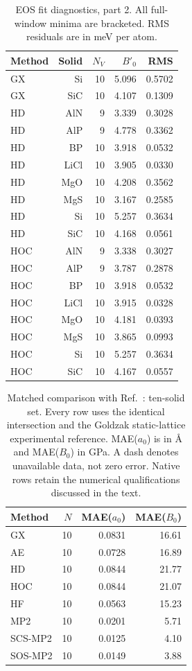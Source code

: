 \begin{table}[t]
\centering
\small
\caption{EOS fit diagnostics, part 2. All full-window minima are bracketed. RMS residuals are in meV per atom.}
\label{tab:eos-fit-2}
\begin{tabular}{lrrrr}
\toprule
Method & Solid & $N_V$ & $B'_0$ & RMS \\
\midrule
GX & Si & 10 & 5.096 & 0.5702 \\
GX & SiC & 10 & 4.107 & 0.1309 \\
HD & AlN & 9 & 3.339 & 0.3028 \\
HD & AlP & 9 & 4.778 & 0.3362 \\
HD & BP & 10 & 3.918 & 0.0532 \\
HD & LiCl & 10 & 3.905 & 0.0330 \\
HD & MgO & 10 & 4.208 & 0.3562 \\
HD & MgS & 10 & 3.167 & 0.2585 \\
HD & Si & 10 & 5.257 & 0.3634 \\
HD & SiC & 10 & 4.168 & 0.0561 \\
HOC & AlN & 9 & 3.338 & 0.3027 \\
HOC & AlP & 9 & 3.787 & 0.2878 \\
HOC & BP & 10 & 3.918 & 0.0532 \\
HOC & LiCl & 10 & 3.915 & 0.0328 \\
HOC & MgO & 10 & 4.181 & 0.0393 \\
HOC & MgS & 10 & 3.865 & 0.0993 \\
HOC & Si & 10 & 5.257 & 0.3634 \\
HOC & SiC & 10 & 4.167 & 0.0557 \\
\bottomrule
\end{tabular}
\end{table}

\begin{table}[t]
\centering
\small
\caption{Matched comparison with Ref.~: ten-solid set. Every row uses the identical intersection and the Goldzak static-lattice experimental reference. MAE($a_0$) is in \AA{} and MAE($B_0$) in GPa. A dash denotes unavailable data, not zero error. Native rows retain the numerical qualifications discussed in the text.}
\label{tab:literature-Goldzak2022}
\begin{tabular}{lrrr}
\toprule
Method & $N$ & MAE($a_0$) & MAE($B_0$) \\
\midrule
GX & 10 & 0.0831 & 16.61 \\
AE & 10 & 0.0728 & 16.89 \\
HD & 10 & 0.0844 & 21.77 \\
HOC & 10 & 0.0844 & 21.07 \\
HF & 10 & 0.0563 & 15.23 \\
MP2 & 10 & 0.0201 & 5.71 \\
SCS-MP2 & 10 & 0.0125 & 4.10 \\
SOS-MP2 & 10 & 0.0149 & 3.88 \\
\bottomrule
\end{tabular}
\end{table}

